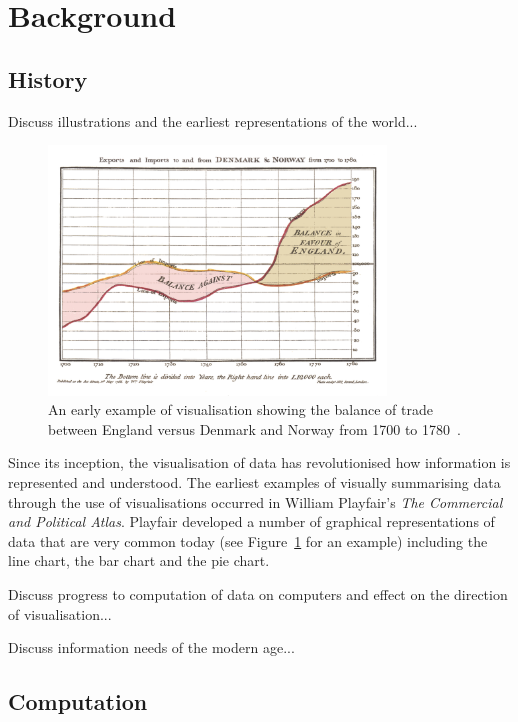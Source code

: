 \section{Background}

\subsection{History}

Discuss illustrations and the earliest representations of the world...

\begin{figure}
    \centering
    \includegraphics[width=0.8\textwidth]{../images/playfair-graph.png}
    \caption{An early example of visualisation showing the balance of trade between England versus Denmark and Norway from 1700 to 1780~\protect\cite{Playfair1786}.}
    \label{fig:playfair-graph}
\end{figure}

Since its inception, the visualisation of data has revolutionised how information is represented and understood. The earliest examples of visually summarising data through the use of visualisations occurred in William Playfair's \textit{The Commercial and Political Atlas}. Playfair developed a number of graphical representations of data that are very common today (see Figure~\ref{fig:playfair-graph} for an example) including the line chart, the bar chart and the pie chart.

Discuss progress to computation of data on computers and effect on the direction of visualisation...

Discuss information needs of the modern age...

\subsection{Computation}

